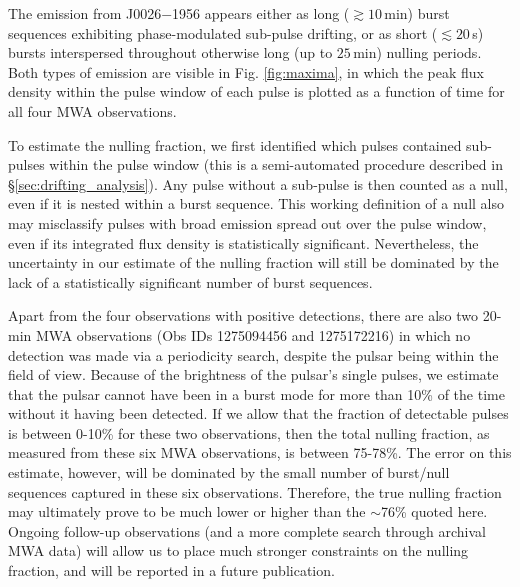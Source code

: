 \documentclass[twocolumn]{aastex631}
\newcommand{\psr}{J0026$-$1956}
\newcommand{\nullfraction}{76\%}
\begin{document}
The emission from \psr{} appears either as long ($\gtrsim 10\,$min) burst sequences exhibiting phase-modulated sub-pulse drifting, or as short ($\lesssim 20\,$s) bursts interspersed throughout otherwise long (up to $25\,$min) nulling periods.
Both types of emission are visible in Fig. \ref{fig:maxima}, in which the peak flux density within the pulse window of each pulse is plotted as a function of time for all four MWA observations.

\begin{figure*}[t]
    \caption{Peak flux density within the pulse window as a function of time for four MWA detections (MJDs given along the $y$-axis). The peak fluxes were measured after smoothing the time series with a Gaussian filter ($\sim$ 2\,ms wide, the approximate width of a sub-pulse) to suppress the noise contribution and accentuate the contrast between nulling and burst sequences. The two horizontal lines represent two other MWA observations (Obs IDs 1275094456 and 1275172216) for which \psr{} was in the MWA field of view, but not detected. Note that the low-level peaks in the $\sim70$-$80\,$mins time range of the MJD 58434 observation are single pulses faintly visible in the pulse stack, but which are faint because the pulsar was moving out of the MWA's primary beam.}
    \label{fig:maxima}
\end{figure*}

To estimate the nulling fraction, we first identified which pulses contained sub-pulses within the pulse window (this is a semi-automated procedure described in \S\ref{sec:drifting_analysis}).
Any pulse without a sub-pulse is then counted as a null, even if it is nested within a burst sequence.
This working definition of a null also may misclassify pulses with broad emission spread out over the pulse window, even if its integrated flux density is statistically significant.
Nevertheless, the uncertainty in our estimate of the nulling fraction will still be dominated by the lack of a statistically significant number of burst sequences.

Apart from the four observations with positive detections, there are also two 20-min MWA observations (Obs IDs 1275094456 and 1275172216) in which no detection was made via a periodicity search, despite the pulsar being within the field of view.
Because of the brightness of the pulsar's single pulses, we estimate that the pulsar cannot have been in a burst mode for more than 10\% of the time without it having been detected.
If we allow that the fraction of detectable pulses is between 0-10\% for these two observations, then the total nulling fraction, as measured from these six MWA observations, is between 75-78\%.
The error on this estimate, however, will be dominated by the small number of burst/null sequences captured in these six observations.
Therefore, the true nulling fraction may ultimately prove to be much lower or higher than the $\sim$\nullfraction{} quoted here.
Ongoing follow-up observations (and a more complete search through archival MWA data) will allow us to place much stronger constraints on the nulling fraction, and will be reported in a future publication.
\end{document}
